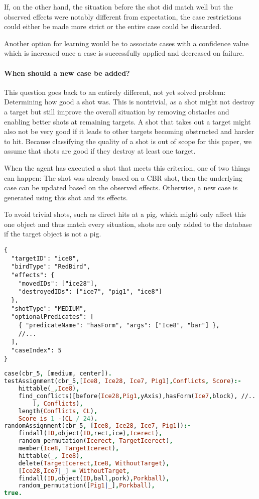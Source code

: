 If, on the other hand, the situation before the shot did match well but the observed effects were notably different from expectation, the case restrictions could either be made more strict or the entire case could be discarded.

Another option for learning would be to associate cases with a confidence value which is increased once a case is successfully applied and decreased on failure.

\paragraph{When should a new case be added?}
This question goes back to an entirely different, not yet solved problem: Determining how good a shot was.
This is nontrivial, as a shot might not destroy a target but still improve the overall situation by removing obstacles and enabling better shots at remaining targets.
A shot that takes out a target might also not be very good if it leads to other targets becoming obstructed and harder to hit.
Because classifying the quality of a shot is out of scope for this paper, we assume that shots are good if they destroy at least one target.

When the agent has executed a shot that meets this criterion, one of two things can happen: The shot was already based on a \ac{CBR} shot, then the underlying case can be updated based on the observed effects. Otherwise, a new case is generated using this shot and its effects.

To avoid trivial shots, such as direct hits at a pig, which might only affect this one object and thus match every situation, shots are only added to the database if the target object is not a pig.

\begin{lstlisting}[caption=exemplary case information outside of Prolog]
{
  "targetID": "ice8",
  "birdType": "RedBird",
  "effects": {
    "movedIDs": ["ice28"],
    "destroyedIDs": ["ice7", "pig1", "ice8"]
  },
  "shotType": "MEDIUM",
  "optionalPredicates": [
    { "predicateName": "hasForm", "args": ["Ice8", "bar"] },
    //...
  ],
  "caseIndex": 5
}    
\end{lstlisting}

\begin{lstlisting}[label=lst:case-prolog, language=Prolog, caption=exemplary case information in Prolog]
case(cbr_5, [medium, center]).
testAssignment(cbr_5,[Ice8, Ice28, Ice7, Pig1],Conflicts, Score):-
    hittable(_,Ice8),
    find_conflicts([before(Ice28,Pig1,yAxis),hasForm(Ice7,block), //...
        ], Conflicts),
    length(Conflicts, CL),
    Score is 1 -(CL / 24).
randomAssignment(cbr_5, [Ice8, Ice28, Ice7, Pig1]):-
    findall(ID,object(ID,rect,ice),Icerect),
    random_permutation(Icerect, TargetIcerect),
    member(Ice8, TargetIcerect),
    hittable(_, Ice8),
    delete(TargetIcerect,Ice8, WithoutTarget),
    [Ice28,Ice7|_] = WithoutTarget,
    findall(ID,object(ID,ball,pork),Porkball),
    random_permutation([Pig1|_],Porkball),
true.
\end{lstlisting}
